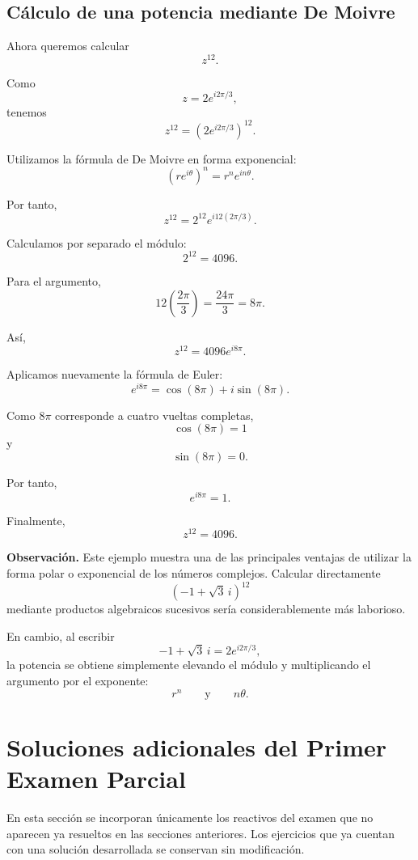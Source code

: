 \documentclass[12pt]{article}
\begin{document}
\subsection{Cálculo de una potencia mediante De Moivre}

Ahora queremos calcular
\[
z^{12}.
\]

Como
\[
z
=
2e^{i2\pi/3},
\]
tenemos
\[
z^{12}
=
\left(
2e^{i2\pi/3}
\right)^{12}.
\]

Utilizamos la fórmula de De Moivre en forma exponencial:
\[
\boxed{
\left(re^{i\theta}\right)^n
=
r^n e^{in\theta}
}.
\]

Por tanto,
\[
z^{12}
=
2^{12}
e^{i12(2\pi/3)}.
\]

Calculamos por separado el módulo:
\[
2^{12}=4096.
\]

Para el argumento,
\[
12\left(\frac{2\pi}{3}\right)
=
\frac{24\pi}{3}
=
8\pi.
\]

Así,
\[
z^{12}
=
4096e^{i8\pi}.
\]

Aplicamos nuevamente la fórmula de Euler:
\[
e^{i8\pi}
=
\cos(8\pi)+i\sin(8\pi).
\]

Como $8\pi$ corresponde a cuatro vueltas completas,
\[
\cos(8\pi)=1
\]
y
\[
\sin(8\pi)=0.
\]

Por tanto,
\[
e^{i8\pi}
=
1.
\]

Finalmente,
\[
\boxed{
z^{12}=4096
}.
\]

\medskip

\noindent
\textbf{Observación.}
Este ejemplo muestra una de las principales ventajas de utilizar
la forma polar o exponencial de los números complejos. Calcular
directamente
\[
(-1+\sqrt{3}\,i)^{12}
\]
mediante productos algebraicos sucesivos sería considerablemente
más laborioso.

En cambio, al escribir
\[
-1+\sqrt{3}\,i
=
2e^{i2\pi/3},
\]
la potencia se obtiene simplemente elevando el módulo y
multiplicando el argumento por el exponente:
\[
r^n
\qquad\text{y}\qquad
n\theta.
\]

\section{Soluciones adicionales del Primer Examen Parcial}

En esta sección se incorporan únicamente los reactivos del examen que no
aparecen ya resueltos en las secciones anteriores. Los ejercicios que ya
cuentan con una solución desarrollada se conservan sin modificación.
\end{document}
